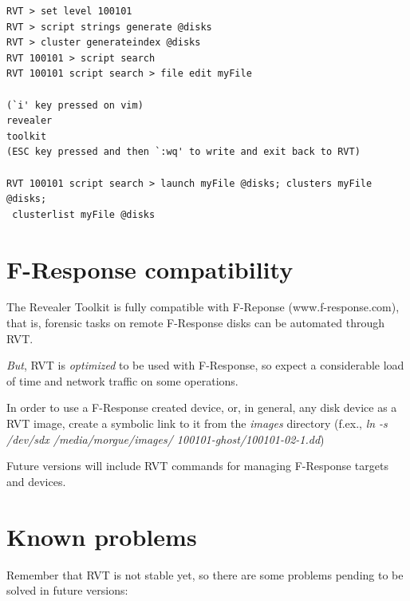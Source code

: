 \documentclass[a4paper,11pt,oneside]{report}
\begin{document}
\begin{verbatim}
RVT > set level 100101
RVT > script strings generate @disks
RVT > cluster generateindex @disks
RVT 100101 > script search
RVT 100101 script search > file edit myFile

(`i' key pressed on vim)
revealer
toolkit
(ESC key pressed and then `:wq' to write and exit back to RVT)

RVT 100101 script search > launch myFile @disks; clusters myFile @disks; 
 clusterlist myFile @disks

\end{verbatim}





\section{F-Response compatibility}

The Revealer Toolkit is fully compatible with F-Reponse (www.f-response.com), that is, forensic tasks on remote F-Response disks can be automated through RVT. 

\emph{But}, RVT is \emph{optimized} to be used with F-Response, so expect a considerable load of time and network traffic on some operations.

In order to use a F-Response created device, or, in general, any disk device as a RVT image, create a symbolic link to it from the \emph{images} directory (f.ex., \emph{ln -s /dev/sdx /media/morgue/images/ 100101-ghost/100101-02-1.dd})

Future versions will include RVT commands for managing F-Response targets and devices.




\section{Known problems}

Remember that RVT is not stable yet, so there are some problems pending to be solved in future versions:
\end{document}
